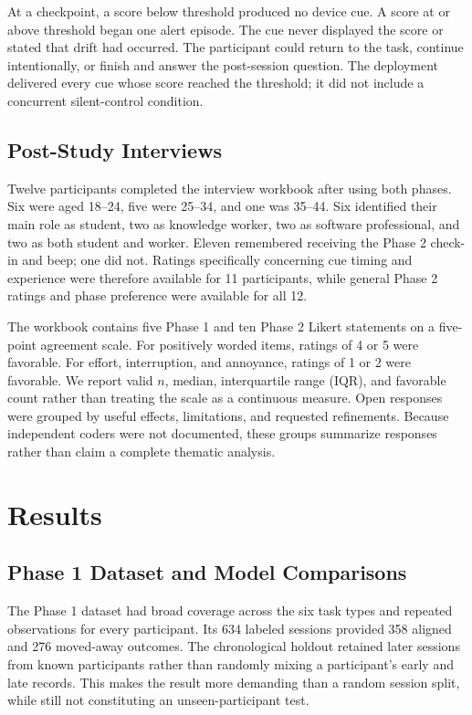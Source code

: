 \documentclass[12pt,a4paper]{article}
\begin{document}
At a checkpoint, a score below threshold produced no device cue. A score at or above threshold began one alert episode. The cue never displayed the score or stated that drift had occurred. The participant could return to the task, continue intentionally, or finish and answer the post-session question. The deployment delivered every cue whose score reached the threshold; it did not include a concurrent silent-control condition.

\subsection{Post-Study Interviews}

Twelve participants completed the interview workbook after using both phases. Six were aged 18--24, five were 25--34, and one was 35--44. Six identified their main role as student, two as knowledge worker, two as software professional, and two as both student and worker. Eleven remembered receiving the Phase 2 check-in and beep; one did not. Ratings specifically concerning cue timing and experience were therefore available for 11 participants, while general Phase 2 ratings and phase preference were available for all 12.

The workbook contains five Phase 1 and ten Phase 2 Likert statements on a five-point agreement scale. For positively worded items, ratings of 4 or 5 were favorable. For effort, interruption, and annoyance, ratings of 1 or 2 were favorable. We report valid $n$, median, interquartile range (IQR), and favorable count rather than treating the scale as a continuous measure. Open responses were grouped by useful effects, limitations, and requested refinements. Because independent coders were not documented, these groups summarize responses rather than claim a complete thematic analysis.

\section{Results}

\subsection{Phase 1 Dataset and Model Comparisons}

The Phase 1 dataset had broad coverage across the six task types and repeated observations for every participant. Its 634 labeled sessions provided 358 aligned and 276 moved-away outcomes. The chronological holdout retained later sessions from known participants rather than randomly mixing a participant's early and late records. This makes the result more demanding than a random session split, while still not constituting an unseen-participant test.
\end{document}
